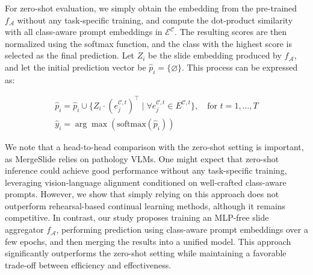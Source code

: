 \documentclass[10pt,twocolumn,letterpaper]{article}
\begin{document}
For zero-shot evaluation, we simply obtain the embedding from the pre-trained $f_{\mathcal{A}}$ without any task-specific training, and compute the dot-product similarity with all class-aware prompt embeddings in $\mathcal{E}^{\mathcal{C}}$. The resulting scores are then normalized using the softmax function, and the class with the highest score is selected as the final prediction. Let $Z_i$ be the slide embedding produced by $f_{\mathcal{A}}$, and let the initial prediction vector be $\hat{p}_i = \{\varnothing\}$. This process can be expressed as:

\begin{equation}
\begin{array}{ll}
\hat{p}_i = \hat{p}_i \cup \{Z_i \cdot (e^{\mathcal{C},t}_{j})^\top \mid \forall e^{\mathcal{C},t}_{j} \in E^{\mathcal{C},t}\}, \quad \text{for } t = 1, \dots, T \\
\hat{y}_i = \arg\max \left(\text{softmax}(\hat{p}_i)\right)
\end{array}
\end{equation}

\noindent We note that a head-to-head comparison with the zero-shot setting is important, as MergeSlide relies on pathology VLMs. One might expect that zero-shot inference could achieve good performance without any task-specific training, leveraging vision-language alignment conditioned on well-crafted class-aware prompts. However, we show that simply relying on this approach does not outperform rehearsal-based continual learning methods, although it remains competitive. In contrast, our study proposes training an MLP-free slide aggregator $f_{\mathcal{A}}$, performing prediction using class-aware prompt embeddings over a few epochs, and then merging the results into a unified model. This approach significantly outperforms the zero-shot setting while maintaining a favorable trade-off between efficiency and effectiveness.
\end{document}
